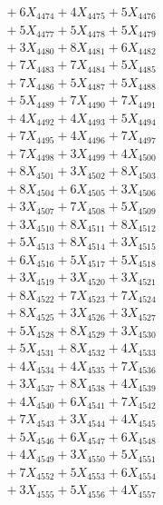 \documentclass[a4paper,10pt]{article}
\begin{document}
{\begin{align}
&\;  + 6 X_{4474} + 4 X_{4475} + 5 X_{4476} \\[0.3ex]
&\;  + 5 X_{4477} + 5 X_{4478} + 5 X_{4479} \\[0.5ex]\allowbreak
&\;  + 3 X_{4480} + 8 X_{4481} + 6 X_{4482} \\[0.3ex]
&\;  + 7 X_{4483} + 7 X_{4484} + 5 X_{4485} \\[0.3ex]
&\;  + 7 X_{4486} + 5 X_{4487} + 5 X_{4488} \\[0.3ex]
&\;  + 5 X_{4489} + 7 X_{4490} + 7 X_{4491} \\[0.3ex]
&\;  + 4 X_{4492} + 4 X_{4493} + 5 X_{4494} \\[0.3ex]
&\;  + 7 X_{4495} + 4 X_{4496} + 7 X_{4497} \\[0.3ex]
&\;  + 7 X_{4498} + 3 X_{4499} + 4 X_{4500} \\[0.3ex]
&\;  + 8 X_{4501} + 3 X_{4502} + 8 X_{4503} \\[0.3ex]
&\;  + 8 X_{4504} + 6 X_{4505} + 3 X_{4506} \\[0.3ex]
&\;  + 3 X_{4507} + 7 X_{4508} + 5 X_{4509} \\[0.5ex]\allowbreak
&\;  + 3 X_{4510} + 8 X_{4511} + 8 X_{4512} \\[0.3ex]
&\;  + 5 X_{4513} + 8 X_{4514} + 3 X_{4515} \\[0.3ex]
&\;  + 6 X_{4516} + 5 X_{4517} + 5 X_{4518} \\[0.3ex]
&\;  + 3 X_{4519} + 3 X_{4520} + 3 X_{4521} \\[0.3ex]
&\;  + 8 X_{4522} + 7 X_{4523} + 7 X_{4524} \\[0.3ex]
&\;  + 8 X_{4525} + 3 X_{4526} + 3 X_{4527} \\[0.3ex]
&\;  + 5 X_{4528} + 8 X_{4529} + 3 X_{4530} \\[0.3ex]
&\;  + 5 X_{4531} + 8 X_{4532} + 4 X_{4533} \\[0.3ex]
&\;  + 4 X_{4534} + 4 X_{4535} + 7 X_{4536} \\[0.3ex]
&\;  + 3 X_{4537} + 8 X_{4538} + 4 X_{4539} \\[0.5ex]\allowbreak
&\;  + 4 X_{4540} + 6 X_{4541} + 7 X_{4542} \\[0.3ex]
&\;  + 7 X_{4543} + 3 X_{4544} + 4 X_{4545} \\[0.3ex]
&\;  + 5 X_{4546} + 6 X_{4547} + 6 X_{4548} \\[0.3ex]
&\;  + 4 X_{4549} + 3 X_{4550} + 5 X_{4551} \\[0.3ex]
&\;  + 7 X_{4552} + 5 X_{4553} + 6 X_{4554} \\[0.3ex]
&\;  + 3 X_{4555} + 5 X_{4556} + 4 X_{4557} \\[0.3ex]

\end{align}}
\end{document}
